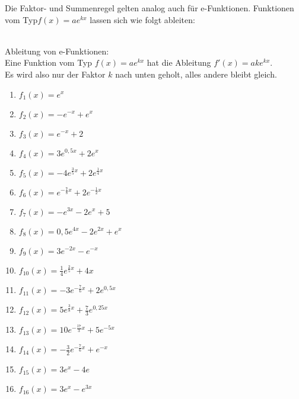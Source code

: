 Die Faktor- und Summenregel gelten analog auch für e-Funktionen. Funktionen vom Typ\linebreak \(f(x)=ae^{kx}\) lassen sich wie folgt ableiten:
\begin{tcolorbox}
	\phantom{text}\\
	\textcolor{loestc}{Ableitung von e-Funktionen:\\
		Eine Funktion vom Typ \(f(x)=ae^{kx}\) hat die Ableitung \(f'(x)=ake^{kx}\).\\
		Es wird also nur der Faktor \(k\) nach unten geholt, alles andere bleibt gleich.}\\
\end{tcolorbox}
\begin{minipage}{\textwidth}
	\begin{Exercise}[title={\raggedright Berechne jeweils allgemein die Ableitung \(f'(x)\)}, label=efktAblA1]
		\begin{minipage}{\textwidth}
			\begin{minipage}{0.49\textwidth}
				\begin{enumerate}[label=\alph*)]
					\item \(f_1(x)=e^x\)
					\item \(f_2(x)=-e^{-x}+e^x\)
					\item \(f_3(x)=e^{-x}+2\)
					\item \(f_4(x)=3e^{0,5x}+2e^x\)
					\item \(f_5(x)=-4e^{\frac{3}{5}x}+2e^{\frac{1}{4}x}\)
					\item \(f_6(x)=e^{-\frac{7}{8}x}+2e^{-\frac{1}{2}x}\)
					\item \(f_7(x)=-e^{3x}-2e^{x}+5\)
					\item \(f_8(x)=0,5e^{4x}-2e^{2x}+e^x\)
				\end{enumerate}
			\end{minipage}
			\begin{minipage}{0.49\textwidth}
				\begin{enumerate}[label=\alph*)]
					\setcounter{enumi}{8}
					\item \(f_9(x)=3e^{-2x}-e^{-x}\)
					\item \(f_{10}(x)=\frac{1}{4}e^{\frac{2}{5}x}+4x\)
					\item \(f_{11}(x)=-3e^{-\frac{7}{6}x}+2e^{0,5x}\)
					\item \(f_{12}(x)=5e^{\frac{3}{8}x}+\frac{7}{3}e^{0,25x}\)
					\item \(f_{13}(x)=10e^{-\frac{17}{3}x}+5e^{-5x}\)
					\item \(f_{14}(x)=-\frac{3}{2}e^{-\frac{7}{6}x}+e^{-x}\)
					\item \(f_{15}(x)=3e^x-4e\)
					\item \(f_{16}(x)=3e^x-e^{3x}\)
				\end{enumerate}
			\end{minipage}
		\end{minipage}
	\end{Exercise}
\end{minipage}
